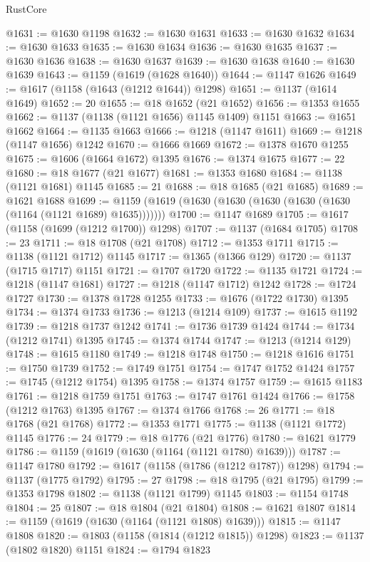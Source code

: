 \begin{lexlean}{RustCore}
\begin{coremodule}
@1631 := @1630 @1198
@1632 := @1630 @1631
@1633 := @1630 @1632
@1634 := @1630 @1633
@1635 := @1630 @1634
@1636 := @1630 @1635
@1637 := @1630 @1636
@1638 := @1630 @1637
@1639 := @1630 @1638
@1640 := @1630 @1639
@1643 := @1159 (@1619 (@1628 @1640))
@1644 := @1147 @1626
@1649 := @1617 (@1158 (@1643 (@1212 @1644)) @1298)
@1651 := @1137 (@1614 @1649)
@1652 := 20
@1655 := @18 @1652 (@21 @1652)
@1656 := @1353 @1655
@1662 := @1137 (@1138 (@1121 @1656) @1145 @1409) @1151
@1663 := @1651 @1662
@1664 := @1135 @1663
@1666 := @1218 (@1147 @1611)
@1669 := @1218 (@1147 @1656) @1242
@1670 := @1666 @1669
@1672 := @1378 @1670 @1255
@1675 := @1606 (@1664 @1672) @1395
@1676 := @1374 @1675
@1677 := 22
@1680 := @18 @1677 (@21 @1677)
@1681 := @1353 @1680
@1684 := @1138 (@1121 @1681) @1145
@1685 := 21
@1688 := @18 @1685 (@21 @1685)
@1689 := @1621 @1688
@1699 := @1159 (@1619 (@1630 (@1630 (@1630 (@1630 (@1630 (@1164 (@1121 @1689) @1635)))))))
@1700 := @1147 @1689
@1705 := @1617 (@1158 (@1699 (@1212 @1700)) @1298)
@1707 := @1137 (@1684 @1705)
@1708 := 23
@1711 := @18 @1708 (@21 @1708)
@1712 := @1353 @1711
@1715 := @1138 (@1121 @1712) @1145
@1717 := @1365 (@1366 @129)
@1720 := @1137 (@1715 @1717) @1151
@1721 := @1707 @1720
@1722 := @1135 @1721
@1724 := @1218 (@1147 @1681)
@1727 := @1218 (@1147 @1712) @1242
@1728 := @1724 @1727
@1730 := @1378 @1728 @1255
@1733 := @1676 (@1722 @1730) @1395
@1734 := @1374 @1733
@1736 := @1213 (@1214 @109)
@1737 := @1615 @1192
@1739 := @1218 @1737 @1242
@1741 := @1736 @1739 @1424
@1744 := @1734 (@1212 @1741) @1395
@1745 := @1374 @1744
@1747 := @1213 (@1214 @129)
@1748 := @1615 @1180
@1749 := @1218 @1748
@1750 := @1218 @1616
@1751 := @1750 @1739
@1752 := @1749 @1751
@1754 := @1747 @1752 @1424
@1757 := @1745 (@1212 @1754) @1395
@1758 := @1374 @1757
@1759 := @1615 @1183
@1761 := @1218 @1759 @1751
@1763 := @1747 @1761 @1424
@1766 := @1758 (@1212 @1763) @1395
@1767 := @1374 @1766
@1768 := 26
@1771 := @18 @1768 (@21 @1768)
@1772 := @1353 @1771
@1775 := @1138 (@1121 @1772) @1145
@1776 := 24
@1779 := @18 @1776 (@21 @1776)
@1780 := @1621 @1779
@1786 := @1159 (@1619 (@1630 (@1164 (@1121 @1780) @1639)))
@1787 := @1147 @1780
@1792 := @1617 (@1158 (@1786 (@1212 @1787)) @1298)
@1794 := @1137 (@1775 @1792)
@1795 := 27
@1798 := @18 @1795 (@21 @1795)
@1799 := @1353 @1798
@1802 := @1138 (@1121 @1799) @1145
@1803 := @1154 @1748
@1804 := 25
@1807 := @18 @1804 (@21 @1804)
@1808 := @1621 @1807
@1814 := @1159 (@1619 (@1630 (@1164 (@1121 @1808) @1639)))
@1815 := @1147 @1808
@1820 := @1803 (@1158 (@1814 (@1212 @1815)) @1298)
@1823 := @1137 (@1802 @1820) @1151
@1824 := @1794 @1823

\end{coremodule}
\end{lexlean}
